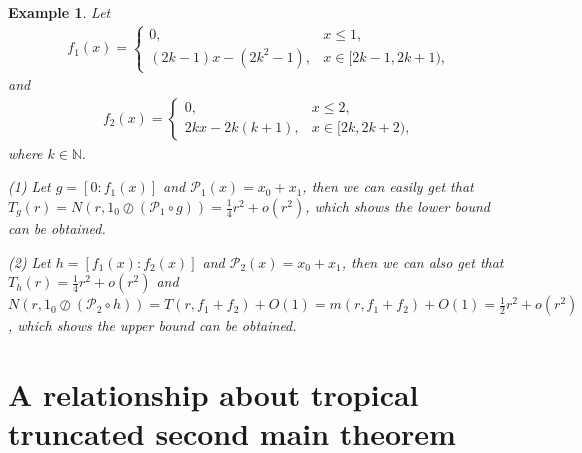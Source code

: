 \documentclass{article}
\newtheorem{exa}[defin]{Example}
\begin{document}
\begin{exa}
    Let 
    \begin{eqnarray*}
        f_{1}(x)=\left\{\begin{array}{ll}
         0, & x\leq 1,\\
         (2k-1)x-(2k^{2}-1), & x\in [2k-1, 2k+1),
         \end{array}\right.
    \end{eqnarray*}
    and
    \begin{eqnarray*}
         f_{2}(x)=\left\{\begin{array}{ll}
         0, & x\leq 2,\\
         2kx-2k(k+1), & x\in [2k, 2k+2),
         \end{array}\right.
    \end{eqnarray*}
    where $k\in\mathbb{N}.$
    
    (1) Let $g=[0: f_{1}(x)]$ and $\mathcal{P}_{1}(x)=x_{0}+x_{1}$, then we can easily get that $T_{g}(r)=N(r, 1_{0}\oslash (\mathcal{P}_{1}\circ g))=\frac{1}{4}r^{2}+o(r^{2})$, which shows the lower bound can be obtained.

    (2) Let $h=[f_{1}(x): f_{2}(x)]$ and $\mathcal{P}_{2}(x)=x_{0}+x_{1}$, then we can also get that $T_{h}(r)=\frac{1}{4}r^{2}+o(r^{2})$ and $N(r, 1_{0}\oslash (\mathcal{P}_{2}\circ h))=T(r, f_{1}+f_{2})+O(1)=m(r, f_{1}+f_{2})+O(1)=\frac{1}{2}r^{2}+o(r^{2})$, which shows the upper bound can be obtained.
\end{exa}
    

\section{A relationship about tropical truncated second main theorem}
\end{document}
